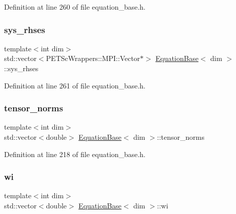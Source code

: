 Definition at line 260 of file equation\+\_\+base.\+h.

\mbox{\label{class_equation_base_a89fe13a13fa7f46cc20bdab8a884216c}} 
\subsubsection{\texorpdfstring{sys\+\_\+rhses}{sys\_rhses}}
{\footnotesize\ttfamily template$<$int dim$>$ \\
std\+::vector$<$P\+E\+T\+Sc\+Wrappers\+::\+M\+P\+I\+::\+Vector$\ast$$>$ \hyperlink{class_equation_base}{Equation\+Base}$<$ dim $>$\+::sys\+\_\+rhses\hspace{0.3cm}{\ttfamily [private]}}



Definition at line 261 of file equation\+\_\+base.\+h.

\mbox{\label{class_equation_base_a2e5e8e486a1e6994c606dc05227752dd}} 
\subsubsection{\texorpdfstring{tensor\+\_\+norms}{tensor\_norms}}
{\footnotesize\ttfamily template$<$int dim$>$ \\
std\+::vector$<$double$>$ \hyperlink{class_equation_base}{Equation\+Base}$<$ dim $>$\+::tensor\+\_\+norms\hspace{0.3cm}{\ttfamily [protected]}}



Definition at line 218 of file equation\+\_\+base.\+h.

\mbox{\label{class_equation_base_a46388ad4bea156033fa98fd8f484a068}} 
\subsubsection{\texorpdfstring{wi}{wi}}
{\footnotesize\ttfamily template$<$int dim$>$ \\
std\+::vector$<$double$>$ \hyperlink{class_equation_base}{Equation\+Base}$<$ dim $>$\+::wi\hspace{0.3cm}{\ttfamily [protected]}}



